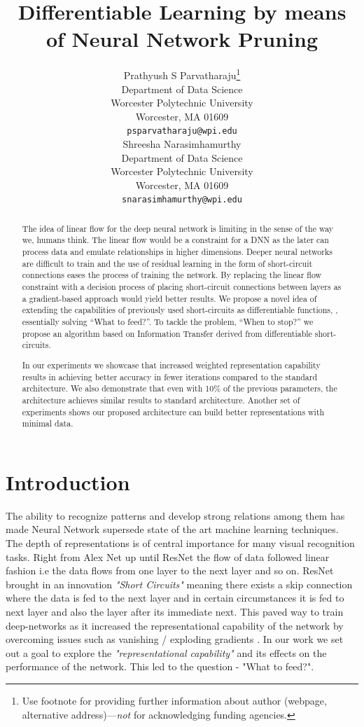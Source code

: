 \documentclass{article}
\title{Differentiable Learning by means of Neural Network Pruning}
\author{
  Prathyush S Parvatharaju\thanks{Use footnote for providing further
    information about author (webpage, alternative
    address)---\emph{not} for acknowledging funding agencies.} \\
  Department of Data Science\\
  Worcester Polytechnic University\\
  Worcester, MA 01609 \\
  \texttt{psparvatharaju@wpi.edu} \\
   \And
 Shreesha Narasimhamurthy \\
  Department of Data Science\\
  Worcester Polytechnic University\\
  Worcester, MA 01609 \\
  \texttt{snarasimhamurthy@wpi.edu} \\
}
\begin{document}
\maketitle

\begin{abstract}
The idea of linear flow for the deep neural network is limiting in the sense of the way we, humans think.
The linear flow would be a constraint for a DNN as the later can process data and emulate relationships
in higher dimensions. Deeper neural networks are difficult to train and the use of residual learning
\cite{He2016DeepRL} in the form of short-circuit connections eases the process of training the network. By
replacing the linear flow constraint with a decision process of placing short-circuit connections between
layers as a gradient-based approach would yield better results. We propose a novel idea of extending
the capabilities of previously used short-circuits as differentiable functions, \cite{Trask2018NeuralAL}, essentially solving “What to feed?”. To tackle the problem, “When to stop?” we propose an algorithm based on Information Transfer derived from differentiable short-circuits. 

In our experiments we showcase that increased weighted representation capability results in achieving better accuracy in fewer iterations compared to the standard architecture. We also demonstrate that even with 10\% of the previous parameters, the architecture achieves similar results to standard architecture. Another set of experiments shows our proposed architecture can build better representations with minimal data.
\end{abstract}




\section{Introduction}
The ability to recognize patterns and develop strong relations among them has made Neural Network supersede state of the art machine learning techniques. The depth of representations is of central importance for many visual recognition tasks. Right from Alex Net \cite{Krizhevsky2012ImageNetCW} up until ResNet \cite{He2016DeepRL} the flow of data followed linear fashion i.e the data flows from one layer to the next layer and so on. ResNet brought in an innovation \emph{"Short Circuits"} meaning there exists a skip connection where the data is fed to the next layer and in certain circumstances it is fed to next layer and also the layer after its immediate next. This paved way to train deep-networks as it increased the representational capability of the network by overcoming issues such as vanishing / exploding gradients \cite{Bengio1994LearningLD, Glorot2010UnderstandingTD}. In our work we set out a goal to explore the \emph{"representational capability"} and its effects on the performance of the network. This led to the question - "What to feed?".
\end{document}
